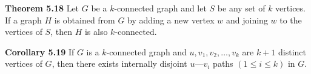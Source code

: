 \nopagenumbers
{\bf Theorem 5.18}
\vskip 6pt
Let $G$ be a $k$-connected graph and let $S$ be any set of $k$ vertices. If a graph $H$ is obtained from $G$ by adding a new vertex $w$ and joining $w$ to the vertices of $S$, then $H$ is also $k$-connected.

\vskip 1in
{\bf Corollary 5.19}
\vskip 6pt
If $G$ is a $k$-connected graph and $u,v_1,v_2, \ldots , v_k$ are $k+1$ distinct vertices of $G$, then there exists internally disjoint $u$---$v_i$ paths $(1 \leq i \leq k)$ in $G$.

\vfill\eject

